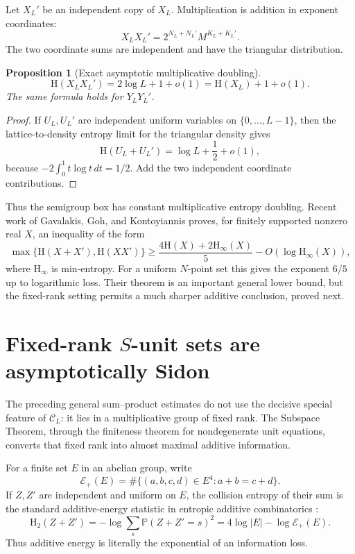 \documentclass[11pt,oneside]{article}
\newtheorem{proposition}[theorem]{Proposition}
\theoremstyle{definition}
\theoremstyle{remark}
\newcommand{\Pp}{\mathbb{P}}
\newcommand{\HH}{\mathrm{H}}
\newcommand{\abs}[1]{\left|#1\right|}
\begin{document}
Let $X_L'$ be an independent copy of $X_L$.  Multiplication is addition in exponent coordinates:
\[
 X_LX_L'=2^{N_L+N_L'}M^{K_L+K_L'}.
\]
The two coordinate sums are independent and have the triangular distribution.

\begin{proposition}[Exact asymptotic multiplicative doubling]\label{prop:mult-entropy}
\begin{equation}\label{eq:mult-entropy}
 \HH(X_LX_L')=2\log L+1+o(1)
 =\HH(X_L)+1+o(1).
\end{equation}
The same formula holds for $Y_LY_L'$.
\end{proposition}

\begin{proof}
If $U_L,U_L'$ are independent uniform variables on $\{0,\ldots,L-1\}$, then the lattice-to-density entropy limit for the triangular density gives
\[
 \HH(U_L+U_L')=\log L+\frac12+o(1),
\]
because $-2\int_0^1t\log t\,dt=1/2$.  Add the two independent coordinate contributions.
\end{proof}

Thus the semigroup box has constant multiplicative entropy doubling.  Recent work of Gavalakis, Goh, and Kontoyiannis proves, for finitely supported nonzero real $X$, an inequality of the form \cite{GavalakisGohKontoyiannis2026}
\begin{equation}\label{eq:recent-entropic-SP}
 \max\{\HH(X+X'),\HH(XX')\}
 \geq\frac{4\HH(X)+2\HH_\infty(X)}5
      -O(\log\HH_\infty(X)),
\end{equation}
where $\HH_\infty$ is min-entropy.  For a uniform $N$-point set this gives the exponent $6/5$ up to logarithmic loss.  Their theorem is an important general lower bound, but the fixed-rank setting permits a much sharper additive conclusion, proved next.


\section{Fixed-rank \texorpdfstring{$S$}{S}-unit sets are asymptotically Sidon}\label{sec:sunit}

The preceding general sum--product estimates do not use the decisive special feature of \(\mathcal C_L\): it lies in a multiplicative group of fixed rank.  The Subspace Theorem, through the finiteness theorem for nondegenerate unit equations, converts that fixed rank into almost maximal additive information.

For a finite set \(E\) in an abelian group, write
\begin{equation}\label{eq:additive-energy-def}
 \mathcal E_+(E)=\#\{(a,b,c,d)\in E^4:a+b=c+d\}.
\end{equation}
If \(Z,Z'\) are independent and uniform on \(E\), the collision entropy of their sum is the standard additive-energy statistic in entropic additive combinatorics \cite{Tao2010}:
\begin{equation}\label{eq:collision-energy}
 \HH_2(Z+Z')=-\log\sum_s\Pp(Z+Z'=s)^2
 =4\log\abs E-\log\mathcal E_+(E).
\end{equation}
Thus additive energy is literally the exponential of an information loss.
\end{document}
